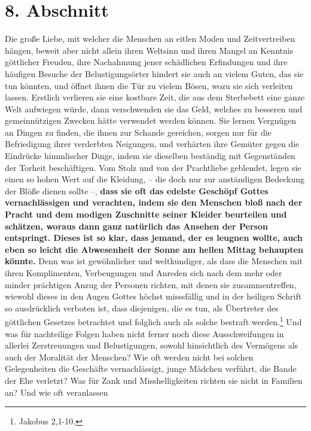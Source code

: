 \section{8. Abschnitt} \label{kap15_ab8}

Die große Liebe, mit welcher die Menschen an eitlen Moden und Zeitvertreiben
hängen, beweit aber nicht allein ihren Weltsinn und ihren Mangel an Kenntnis
göttlicher Freuden, ihre Nachahmung jener schädlichen Erfindungen und ihre
häufigen Besuche der Belustigungsörter hindert sie auch an vielem Guten, das
sie tun könnten, und öffnet ihnen die Tür zu vielem Bösen, wozu sie sich
verleiten lassen. Erstlich verlieren sie eine kostbare Zeit, die aus dem
Sterbebett eine ganze Welt aufwiegen würde, dann verschwenden sie das Geld,
welches zu besseren und gemeinnützigen Zwecken hätte verwendet werden können.
Sie lernen Vergnügen an Dingen zu finden, die ihnen zur Schande gereichen,
sorgen
nur für die Befriedigung ihrer verderbten Neigungen, und verhärten ihre Gemüter
gegen die Eindrücke himmlischer Dinge, indem sie dieselben beständig mit
Gegenständen der Torheit beschäftigen. Vom Stolz und von der Prachtliebe
geblendet, legen sie einen so hohen Wert auf die Kleidung, -- die doch nur zur
anständigen Bedeckung der Blöße dienen sollte --, \textbf{dass sie oft das
edelste
Geschöpf Gottes vernachlässigen und verachten, indem sie den Menschen bloß nach
der Pracht und dem modigen Zuschnitte seiner Kleider beurteilen und schätzen,
woraus dann ganz natürlich das Ansehen der Person entspringt. Dieses ist so
klar, dass jemand, der es leugnen wollte, auch eben so leicht die Abwesenheit
der
Sonne am hellen Mittag behaupten könnte.} Denn was ist gewöhnlicher und
weltkundiger, als dass die Menschen mit ihren Komplimenten, Verbeugungen und
Anreden sich nach dem mehr oder minder prächtigen Anzug der Personen richten,
mit denen sie zusammentreffen, wiewohl dieses in den Augen Gottes höchst
misssfällig und in der heiligen Schrift so ausdrücklich verboten ist, dass
diejenigen, die es tun, als Übertreter des göttlichen Gesetzes betrachtet und
folglich auch als solche bestraft werden.\footnote{Jakobus 2,1-10.}
Und was für nachteilige
Folgen haben nicht ferner noch diese Ausschweifungen in allerlei Zerstreuungen
und Belustigungen, sowohl hinsichtlich des Vermögens als auch der Moralität der
Menschen? Wie oft werden nicht bei solchen Gelegenheiten die Geschäfte
vernachlässigt, junge Mädchen verführt, die Bande der Ehe
verletzt? Was für Zank
und Misshelligkeiten richten sie nicht in Familien an? Und wie oft veranlassen
